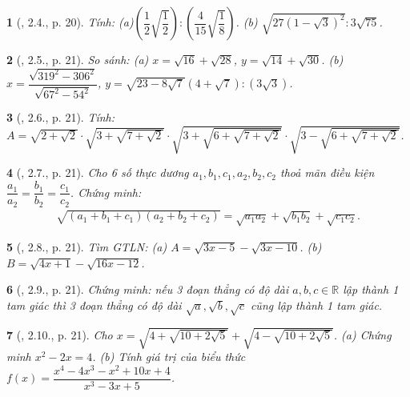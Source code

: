 \documentclass{article}
\newtheorem{baitoan}{}%
\begin{document}
\begin{baitoan}[\cite{Binh_boi_duong_Toan_9_tap_1}, 2.4., p. 20]
	Tính: (a)$\left(\dfrac{1}{2}\sqrt{\dfrac{1}{2}}\right):\left(\dfrac{4}{15}\sqrt{\dfrac{1}{8}}\right)$. (b) $\sqrt{27(1 - \sqrt{3})^2}:3\sqrt{75}$.
\end{baitoan}

\begin{baitoan}[\cite{Binh_boi_duong_Toan_9_tap_1}, 2.5., p. 21]
	So sánh: (a) $x = \sqrt{16} + \sqrt{28}$, $y = \sqrt{14} + \sqrt{30}$. (b) $x = \dfrac{\sqrt{319^2 - 306^2}}{\sqrt{67^2 - 54^2}}$, $y = \sqrt{23 - 8\sqrt{7}}(4 + \sqrt{7}):(3\sqrt{3})$.
\end{baitoan}

\begin{baitoan}[\cite{Binh_boi_duong_Toan_9_tap_1}, 2.6., p. 21]
	Tính: $A = \sqrt{2 + \sqrt{2}}\cdot\sqrt{3 + \sqrt{7 + \sqrt{2}}}\cdot\sqrt{3 + \sqrt{6 + \sqrt{7 + \sqrt{2}}}}\cdot\sqrt{3 - \sqrt{6 + \sqrt{7 + \sqrt{2}}}}$.
\end{baitoan}

\begin{baitoan}[\cite{Binh_boi_duong_Toan_9_tap_1}, 2.7., p. 21]
	Cho 6 số thực dương $a_1,b_1,c_1,a_2,b_2,c_2$ thoả mãn điều kiện $\dfrac{a_1}{a_2} = \dfrac{b_1}{b_2} = \dfrac{c_1}{c_2}$. Chứng minh:
	\begin{align*}
		\sqrt{(a_1 + b_1 + c_1)(a_2 + b_2 + c_2)} = \sqrt{a_1a_2} + \sqrt{b_1b_2} + \sqrt{c_1c_2}.
	\end{align*}
\end{baitoan}

\begin{baitoan}[\cite{Binh_boi_duong_Toan_9_tap_1}, 2.8., p. 21]
	Tìm {\rm GTLN}: (a) $A = \sqrt{3x - 5} - \sqrt{3x - 10}$. (b) $B = \sqrt{4x + 1} - \sqrt{16x - 12}$.
\end{baitoan}

\begin{baitoan}[\cite{Binh_boi_duong_Toan_9_tap_1}, 2.9., p. 21]
	Chứng minh: nếu 3 đoạn thẳng có độ dài $a,b,c\in\mathbb{R}$ lập thành 1 tam giác thì 3 đoạn thẳng có độ dài $\sqrt{a},\sqrt{b},\sqrt{c}$ cũng lập thành 1 tam giác.
\end{baitoan}

\begin{baitoan}[\cite{Binh_boi_duong_Toan_9_tap_1}, 2.10., p. 21]
	Cho $x = \sqrt{4 + \sqrt{10 + 2\sqrt{5}}} + \sqrt{4 - \sqrt{10 + 2\sqrt{5}}}$. (a) Chứng minh $x^2 - 2x = 4$. (b) Tính giá trị của biểu thức $f(x) = \dfrac{x^4 - 4x^3 - x^2 + 10x + 4}{x^3 - 3x + 5}$.
\end{baitoan}
\end{document}
